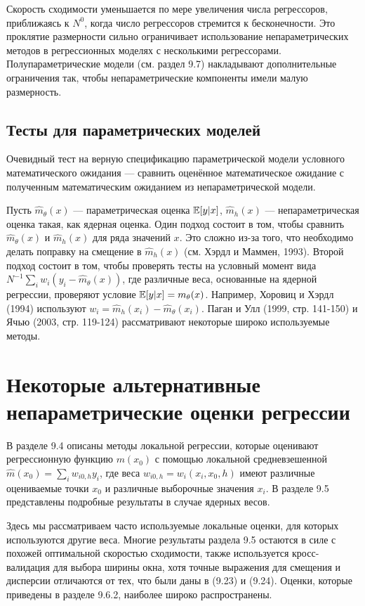 Скорость сходимости уменьшается по мере увеличения числа регрессоров, приближаясь к $N^0$, когда число регрессоров стремится к бесконечности. Это проклятие размерности сильно ограничивает использование непараметрических методов в регрессионных моделях с несколькими регрессорами. Полупараметрические модели (см. раздел 9.7) накладывают дополнительные ограничения так, чтобы непараметрические компоненты имели малую размерность.

\subsection{Тесты для параметрических моделей} 

Очевидный тест на верную спецификацию параметрической модели условного математического ожидания --- сравнить оценённое математическое ожидание с полученным математическим ожиданием из непараметрической модели.

Пусть $\hat{m}_{\theta}(x)$ --- параметрическая оценка $\mathbb{E}[y|x]$, $\hat{m}_h(x)$ --- непараметрическая оценка такая, как  ядерная оценка. Один подход состоит в том, чтобы сравнить  $\hat{m}_{\theta}(x)$ и $\hat{m}_h(x)$ для ряда значений $x$. Это сложно из-за того, что необходимо делать поправку на смещение в $\hat{m}_h(x)$ (см. Хэрдл и Маммен, 1993). Второй подход состоит в том, чтобы проверять тесты на условный момент вида $N^{-1}\sum_i w_i(y_i - \hat{m}_{\theta}(x))$, где различные веса, основанные на ядерной регрессии, проверяют условие $\mathbb{E}[y|x] = m_{\theta}(x)$. Например, Хоровиц и Хэрдл (1994) используют $w_i = \hat{m}_h(x_i) - \hat{m}_{\theta}(x_i)$. Паган и Улл (1999, стр. 141-150) и Ячью (2003, стр. 119-124) рассматривают некоторые широко используемые методы.

\section{Некоторые альтернативные непараметрические оценки регрессии}

В разделе 9.4 описаны методы локальной регрессии, которые оценивают регрессионную функцию $m(x_0)$ с помощью локальной средневзешенной $\hat{m}(x_0) = \sum_i w_{i0,h}y_i$, где веса $w_{i0,h} = w_i(x_i, x_0, h)$ имеют различные оцениваемые точки $x_0$ и различные выборочные значения $x_i$. В разделе 9.5 представлены подробные результаты в случае ядерных весов.

Здесь мы рассматриваем часто используемые локальные оценки, для которых используются другие веса. Многие результаты раздела 9.5 остаются в силе с похожей оптимальной скоростью сходимости, также используется кросс-валидация для выбора ширины окна, хотя точные выражения для смещения и дисперсии отличаются от тех, что были даны в (9.23) и (9.24). Оценки, которые приведены в разделе 9.6.2, наиболее широко распространены.

